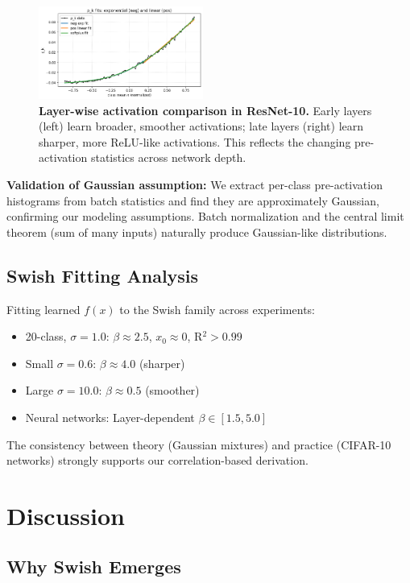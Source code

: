 \documentclass{article}
\begin{document}
\begin{figure}[t]
\centering
\includegraphics[width=0.48\textwidth]{figures/fig8.png}
\caption{\textbf{Layer-wise activation comparison in ResNet-10.} Early layers (left) learn broader, smoother activations; late layers (right) learn sharper, more ReLU-like activations. This reflects the changing pre-activation statistics across network depth.}
\label{fig:layer_comparison}
\end{figure}

\textbf{Validation of Gaussian assumption:} We extract per-class pre-activation histograms from batch statistics and find they are approximately Gaussian, confirming our modeling assumptions. Batch normalization and the central limit theorem (sum of many inputs) naturally produce Gaussian-like distributions.

\subsection{Swish Fitting Analysis}

Fitting learned $f(x)$ to the Swish family across experiments:
\begin{itemize}
\item 20-class, $\sigma=1.0$: $\beta \approx 2.5$, $x_0 \approx 0$, R$^2 > 0.99$
\item Small $\sigma=0.6$: $\beta \approx 4.0$ (sharper)
\item Large $\sigma=10.0$: $\beta \approx 0.5$ (smoother)
\item Neural networks: Layer-dependent $\beta \in [1.5, 5.0]$
\end{itemize}

The consistency between theory (Gaussian mixtures) and practice (CIFAR-10 networks) strongly supports our correlation-based derivation.

\section{Discussion}
\label{sec:discussion}

\subsection{Why Swish Emerges}
\end{document}
